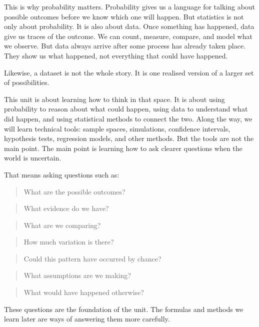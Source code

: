 \documentclass[
  letterpaper,
  DIV=11,
  numbers=noendperiod]{scrreprt}
\begin{document}
This is why probability matters. Probability gives us a language for
talking about possible outcomes before we know which one will happen.
But statistics is not only about probability. It is also about data.
Once something has happened, data give us traces of the outcome. We can
count, measure, compare, and model what we observe. But data always
arrive after some process has already taken place. They show us what
happened, not everything that could have happened.

Likewise, a dataset is not the whole story. It is one realised version
of a larger set of possibilities.

This unit is about learning how to think in that space. It is about
using probability to reason about what could happen, using data to
understand what did happen, and using statistical methods to connect the
two. Along the way, we will learn technical tools: sample spaces,
simulations, confidence intervals, hypothesis tests, regression models,
and other methods. But the tools are not the main point. The main point
is learning how to ask clearer questions when the world is uncertain.

That means asking questions such as:

\begin{quote}
What are the possible outcomes?
\end{quote}

\begin{quote}
What evidence do we have?
\end{quote}

\begin{quote}
What are we comparing?
\end{quote}

\begin{quote}
How much variation is there?
\end{quote}

\begin{quote}
Could this pattern have occurred by chance?
\end{quote}

\begin{quote}
What assumptions are we making?
\end{quote}

\begin{quote}
What would have happened otherwise?
\end{quote}

These questions are the foundation of the unit. The formulas and methods
we learn later are ways of answering them more carefully.
\end{document}
